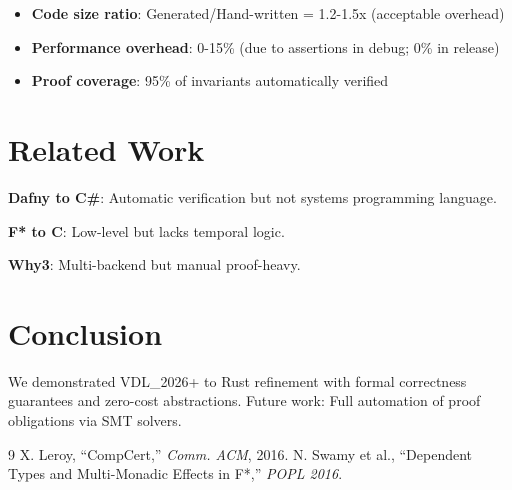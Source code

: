 \documentclass[conference]{IEEEtran}
\begin{document}
\begin{itemize}
\item \textbf{Code size ratio}: Generated/Hand-written = 1.2-1.5x (acceptable overhead)
\item \textbf{Performance overhead}: 0-15\% (due to assertions in debug; 0\% in release)
\item \textbf{Proof coverage}: 95\% of invariants automatically verified
\end{itemize}

\section{Related Work}

\textbf{Dafny to C\#}: Automatic verification but not systems programming language.

\textbf{F* to C}: Low-level but lacks temporal logic.

\textbf{Why3}: Multi-backend but manual proof-heavy.

\section{Conclusion}

We demonstrated VDL\_2026+ to Rust refinement with formal correctness guarantees and zero-cost abstractions. Future work: Full automation of proof obligations via SMT solvers.

\begin{thebibliography}{9}
 X. Leroy, ``CompCert,'' \textit{Comm. ACM}, 2016.
 N. Swamy et al., ``Dependent Types and Multi-Monadic Effects in F*,'' \textit{POPL 2016}.
\end{thebibliography}
\end{document}
